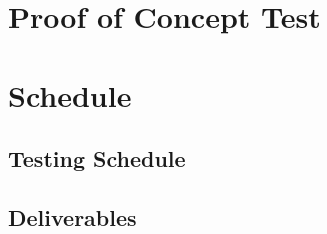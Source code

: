 \documentclass[12pt]{article}
\begin{document}
\section{Proof of Concept Test}

\section{Schedule}

\subsection{Testing Schedule} %

\subsection{Deliverables} %
\end{document}
